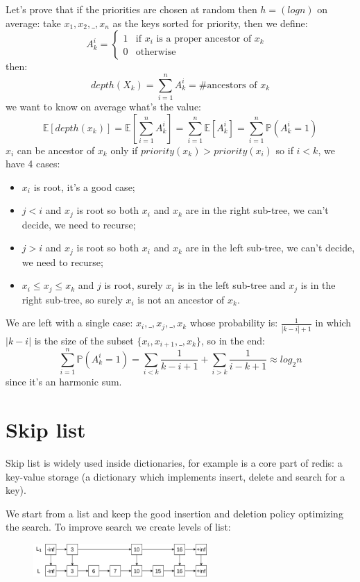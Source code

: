 Let's prove that if the priorities are chosen at random then $h = (logn)$ on average: take $x_1, x_2, \_, x_n$ as the keys sorted for priority, then we define:
$$
A_k^i = 
\begin{cases}
    1 & \text{if $x_i$ is a proper ancestor of $x_k$ } \\
    0 & \text{otherwise}
\end{cases}
$$
then:
$$
    depth(X_k) = \sum_{i=1}^{n} A_k^i = \#\text{ancestors of } x_k
$$
we want to know on average what's the value:
$$
    \mathbb{E}[ depth(x_k) ] = \mathbb{E}\left[ \sum_{i=1}^n A_k^i \right] = \sum_{i=1}^n \mathbb{E}[A_k^i] = \sum_{i=1}^n \mathbb{P}(A_k^i = 1) 
$$
$x_i$ can be ancestor of $x_k$ only if $priority(x_k) > priority(x_i)$ so if $i < k$, we have 4 cases:
\begin{itemize}
    \item $x_i$ is root, it's a good case;
    \item $j < i$ and $x_j$ is root so both $x_i$ and $x_k$ are in the right sub-tree, we can't decide, we need to recurse;
    \item $j > i$ and $x_j$ is root so both $x_i$ and $x_k$ are in the left sub-tree, we can't decide, we need to recurse;
    \item $x_i \leq x_j \leq x_k$ and $j$ is root, surely $x_i$ is in the left sub-tree and $x_j$ is in the right sub-tree, so surely $x_i$ is not an ancestor of $x_k$.
\end{itemize}
We are left with a single case: $x_i, \_, x_j, \_, x_k$ whose probability is: $\frac{1}{|k - i| + 1}$ in which $|k - i|$ is the size of the subset $\{x_i, x_{i+1}, \_, x_k\}$, so in the end:
$$
    \sum_{i=1}^n \mathbb{P}(A_k^i = 1) = \sum_{i<k} \frac{1}{k-i+1} + \sum_{i>k} \frac{1}{i-k+1} \approx log_2 n
$$
since it's an harmonic sum.

\section{Skip list}
Skip list is widely used inside dictionaries, for example is a core part of redis: a key-value storage (a dictionary which implements insert, delete and search for a key).

We start from a list and keep the good insertion and deletion policy optimizing the search.
To improve search we create levels of list:
\begin{figure}[H]
    \centering
    \includegraphics[width=250px]{images/4_Randomized_data_structures/deterministic_skip_list.png}
\end{figure}


